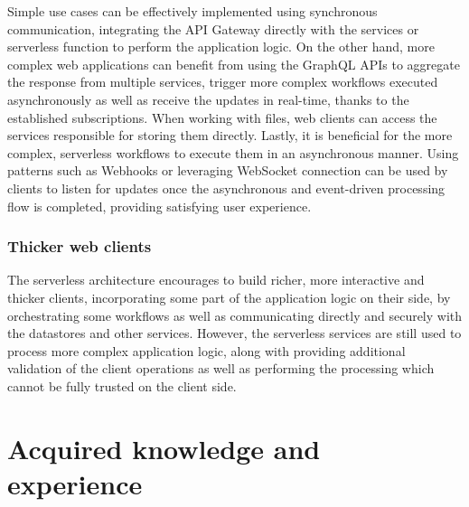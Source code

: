 Simple use cases can be effectively implemented using synchronous communication, integrating the API Gateway directly with the services or serverless function to perform the application logic.
On the other hand, more complex web applications can benefit from using the GraphQL APIs to aggregate the response from multiple services, trigger more complex workflows executed asynchronously as well as receive the updates in real-time, thanks to the established subscriptions.
When working with files, web clients can access the services responsible for storing them directly.
Lastly, it is beneficial for the more complex, serverless workflows to execute them in an asynchronous manner.
Using patterns such as Webhooks or leveraging WebSocket connection can be used by clients to listen for updates once the asynchronous and event-driven processing flow is completed, providing satisfying user experience.



\subsubsection{Thicker web clients}

The serverless architecture encourages to build richer, more interactive and thicker clients, incorporating some part of the application logic on their side, by orchestrating some workflows as well as communicating directly and securely with the datastores and other services.
However, the serverless services are still used to process more complex application logic, along with providing additional validation of the client operations as well as performing the processing which cannot be fully trusted on the client side.

\section{Acquired knowledge and experience}

